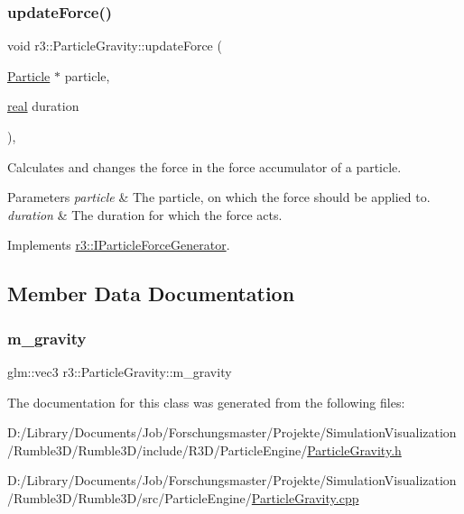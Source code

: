 \subsubsection{\texorpdfstring{update\+Force()}{updateForce()}}
{\footnotesize\ttfamily void r3\+::\+Particle\+Gravity\+::update\+Force (\begin{DoxyParamCaption}\item[{\mbox{\hyperlink{classr3_1_1_particle}{Particle}} $\ast$}]{particle,  }\item[{\mbox{\hyperlink{namespacer3_ab2016b3e3f743fb735afce242f0dc1eb}{real}}}]{duration }\end{DoxyParamCaption})\hspace{0.3cm}{\ttfamily [override]}, {\ttfamily [virtual]}}



Calculates and changes the force in the force accumulator of a particle. 


\begin{DoxyParams}{Parameters}
{\em particle} & The particle, on which the force should be applied to. \\
\hline
{\em duration} & The duration for which the force acts. \\
\hline
\end{DoxyParams}


Implements \mbox{\hyperlink{classr3_1_1_i_particle_force_generator_a8b692fc3a40f815dc44c106b451c3a90}{r3\+::\+I\+Particle\+Force\+Generator}}.



\subsection{Member Data Documentation}
\mbox{\label{classr3_1_1_particle_gravity_a4e21b444ed08aa8c66ca40a11f34c384}} 
\subsubsection{\texorpdfstring{m\+\_\+gravity}{m\_gravity}}
{\footnotesize\ttfamily glm\+::vec3 r3\+::\+Particle\+Gravity\+::m\+\_\+gravity\hspace{0.3cm}{\ttfamily [protected]}}



The documentation for this class was generated from the following files\+:\begin{DoxyCompactItemize}
\item 
D\+:/\+Library/\+Documents/\+Job/\+Forschungsmaster/\+Projekte/\+Simulation\+Visualization/\+Rumble3\+D/\+Rumble3\+D/include/\+R3\+D/\+Particle\+Engine/\mbox{\hyperlink{_particle_gravity_8h}{Particle\+Gravity.\+h}}\item 
D\+:/\+Library/\+Documents/\+Job/\+Forschungsmaster/\+Projekte/\+Simulation\+Visualization/\+Rumble3\+D/\+Rumble3\+D/src/\+Particle\+Engine/\mbox{\hyperlink{_particle_gravity_8cpp}{Particle\+Gravity.\+cpp}}\end{DoxyCompactItemize}
